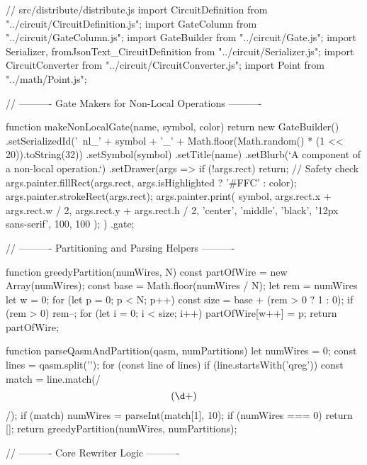 // src/distribute/distribute.js
import { CircuitDefinition } from "../circuit/CircuitDefinition.js";
import { GateColumn } from "../circuit/GateColumn.js";
import { GateBuilder } from "../circuit/Gate.js";
import { Serializer, fromJsonText_CircuitDefinition } from "../circuit/Serializer.js";
import { CircuitConverter } from "../circuit/CircuitConverter.js";
import { Point } from "../math/Point.js";

// ---------- Gate Makers for Non-Local Operations ----------

function makeNonLocalGate(name, symbol, color) {
    return new GateBuilder()
        .setSerializedId('~nl_' + symbol + '_' + Math.floor(Math.random() * (1 << 20)).toString(32))
        .setSymbol(symbol)
        .setTitle(name)
        .setBlurb(`A component of a non-local operation.`)
        .setDrawer(args => {
            if (!args.rect) return; // Safety check
            args.painter.fillRect(args.rect, args.isHighlighted ? '#FFC' : color);
            args.painter.strokeRect(args.rect);
            args.painter.print(
                symbol,
                args.rect.x + args.rect.w / 2,
                args.rect.y + args.rect.h / 2,
                'center', 'middle', 'black', '12px sans-serif', 100, 100
            );
        })
        .gate;
}

// ---------- Partitioning and Parsing Helpers ----------

function greedyPartition(numWires, N) {
  const partOfWire = new Array(numWires);
  const base = Math.floor(numWires / N);
  let rem = numWires %
  let w = 0;
  for (let p = 0; p < N; p++) {
    const size = base + (rem > 0 ? 1 : 0);
    if (rem > 0) rem--;
    for (let i = 0; i < size; i++) {
      partOfWire[w++] = p;
    }
  }
  return partOfWire;
}

function parseQasmAndPartition(qasm, numPartitions) {
    let numWires = 0;
    const lines = qasm.split('\n');
    for (const line of lines) {
        if (line.startsWith('qreg')) {
            const match = line.match(/\[(\d+)\]/);
            if (match) numWires = parseInt(match[1], 10);
        }
    }
    if (numWires === 0) return [];
    return greedyPartition(numWires, numPartitions);
}

// ---------- Core Rewriter Logic ----------

